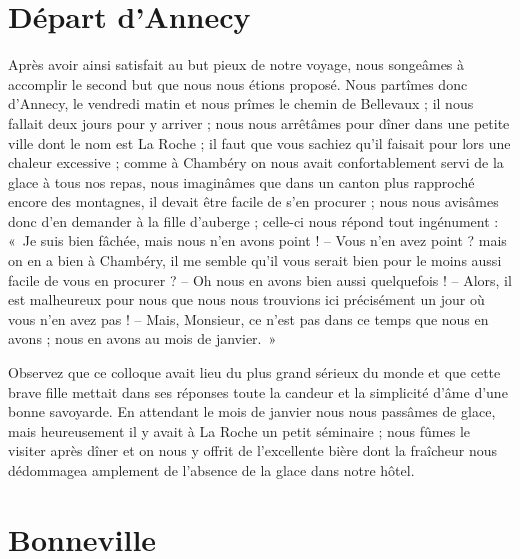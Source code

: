 \documentclass[11pt,a4paper]{report}
\begin{document}
\section*{Départ d'Annecy}

Après avoir ainsi satisfait au but pieux de notre voyage, nous songeâmes à accomplir le second but que nous nous étions proposé. Nous partîmes donc d'Annecy, le vendredi matin et nous prîmes le chemin de Bellevaux ; il nous fallait deux jours pour y arriver ; nous nous arrêtâmes pour dîner dans une petite ville dont le nom est La Roche ; il faut que vous sachiez qu'il faisait pour lors une chaleur excessive ; comme à Chambéry on nous avait confortablement servi de la glace à tous nos repas, nous imaginâmes que dans un canton plus rapproché encore des montagnes, il devait être facile de s'en procurer ; nous nous avisâmes donc d'en demander à la fille d'auberge ; celle-ci nous répond tout ingénument : «~Je suis bien fâchée, mais nous n'en avons point !
-- Vous n'en avez point ? mais on en a bien à Chambéry, il me semble qu'il vous serait bien pour le moins aussi facile de vous en procurer ?
-- Oh nous en avons bien aussi quelquefois !
-- Alors, il est malheureux pour nous que nous nous trouvions ici précisément un jour où vous n'en avez pas !
-- Mais, Monsieur, ce n'est pas dans ce temps que nous en avons ; nous en avons au mois de janvier.~»

Observez que ce colloque avait lieu du plus grand sérieux du monde et que cette brave fille mettait dans ses réponses toute la candeur et la simplicité d'âme d'une bonne savoyarde. En attendant le mois de janvier nous nous passâmes de glace, mais heureusement il y avait à La Roche un petit séminaire ; nous fûmes le visiter après dîner et on nous y offrit de l'excellente bière dont la fraîcheur nous dédommagea amplement de l'absence de la glace dans notre hôtel.

\section*{Bonneville}
\end{document}
